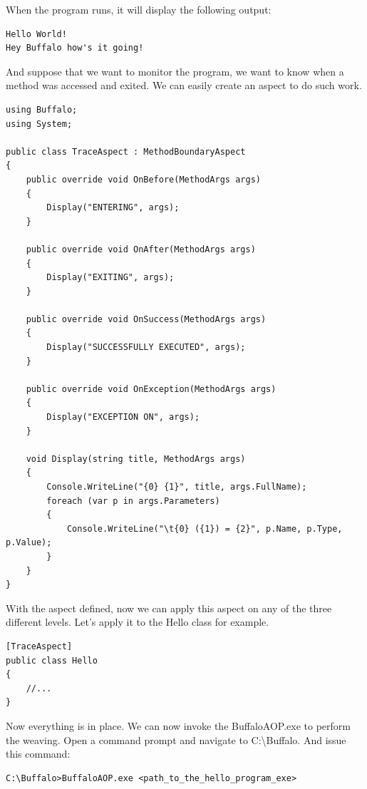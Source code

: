 When the program runs, it will display the following output:
\begin{lstlisting}[caption={Hello program output}, label=helloout, frame=tb, basicstyle=\scriptsize]
Hello World!
Hey Buffalo how's it going!
\end{lstlisting}

And suppose that we want to monitor the program, we want to know when a method was accessed and exited. We can easily create an aspect to do such work.

\begin{lstlisting}[caption={TraceAspect}, label=traceaspect, frame=tb, basicstyle=\scriptsize]
using Buffalo;
using System;

public class TraceAspect : MethodBoundaryAspect
{
    public override void OnBefore(MethodArgs args)
    {
        Display("ENTERING", args);
    }

    public override void OnAfter(MethodArgs args)
    {
        Display("EXITING", args);
    }

    public override void OnSuccess(MethodArgs args)
    {
        Display("SUCCESSFULLY EXECUTED", args);
    }

    public override void OnException(MethodArgs args)
    {
        Display("EXCEPTION ON", args);
    }

    void Display(string title, MethodArgs args)
    {
        Console.WriteLine("{0} {1}", title, args.FullName);
        foreach (var p in args.Parameters)
        {
            Console.WriteLine("\t{0} ({1}) = {2}", p.Name, p.Type, p.Value);
        }
    }
}
\end{lstlisting}

With the aspect defined, now we can apply this aspect on any of the three different levels. Let's apply it to the Hello class for example.
\begin{lstlisting}[caption={Apply Aspect to the Hello Class}, label=helloaspect, frame=tb, basicstyle=\scriptsize]
[TraceAspect]
public class Hello
{
	//...
}
\end{lstlisting}

Now everything is in place. We can now invoke the BuffaloAOP.exe to perform the weaving. Open a command prompt and navigate to C:\textbackslash{Buffalo}. And issue this command:

\begin{lstlisting}[caption={Invoking BuffaloAOP.exe}, label=buffalocmd, frame=tb, basicstyle=\scriptsize]
C:\Buffalo>BuffaloAOP.exe <path_to_the_hello_program_exe>
\end{lstlisting}

